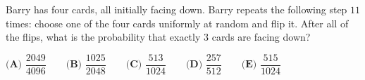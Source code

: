 Barry has four cards, all initially facing down. Barry repeats the following step $11$ times: choose one of the four cards uniformly at random and flip it. After all of the flips, what is the probability that exactly $3$ cards are facing down?

$\textbf{(A) }\dfrac{2049}{4096}\qquad\textbf{(B) }\dfrac{1025}{2048}\qquad\textbf{(C) }\dfrac{513}{1024}\qquad\textbf{(D) }\dfrac{257}{512}\qquad\textbf{(E) }\dfrac{515}{1024}$

